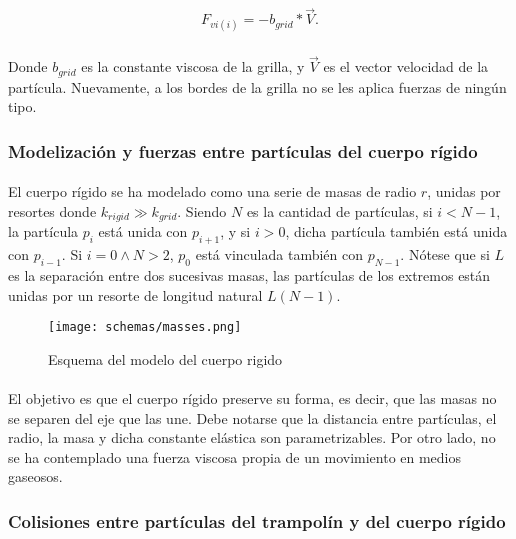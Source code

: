\documentclass[12pt, twocolumn]{article}
\begin{document}
	\begin{align}
	    F_{vi(i)} = -b_{grid}*\Vec{V}.
	\end{align}
	
	\paragraph{} Donde $b_{grid}$ es la constante viscosa de la grilla, y $\Vec{V}$ es el vector velocidad de la partícula. Nuevamente, a los bordes de la grilla no se les aplica fuerzas de ningún tipo. 
	
	\subsubsection{Modelización y fuerzas entre partículas del cuerpo rígido}
	
	\paragraph{} El cuerpo rígido se ha modelado como una serie de masas de radio $r$, unidas por resortes donde $k_{rigid} \gg k_{grid}$. Siendo $N$ es la cantidad de partículas, si $i < N-1$, la partícula $p_{i}$ está unida con $p_{i+1}$, y si $i > 0$, dicha partícula también está unida con $p_{i-1}$. Si $i = 0 \land N > 2$, $p_{0}$ está vinculada también con $p_{N-1}$. Nótese que si $L$ es la separación entre dos sucesivas masas, las partículas de los extremos están unidas por un resorte de longitud natural $L(N-1)$.
	
    \begin{figure}[H]
		\centering
		\texttt{[image: schemas/masses.png]}
		\caption{Esquema del modelo del cuerpo rigido}
		\label{masseschema}
	\end{figure}
	
	\paragraph{} El objetivo es que el cuerpo rígido preserve su forma, es decir, que las masas no se separen del eje que las une. Debe notarse que la distancia entre partículas, el radio, la masa y dicha constante elástica son parametrizables. Por otro lado, no se ha contemplado una fuerza viscosa propia de un movimiento en medios gaseosos.
	
	\subsubsection{Colisiones entre partículas del trampolín y del cuerpo rígido}
	
\end{document}
